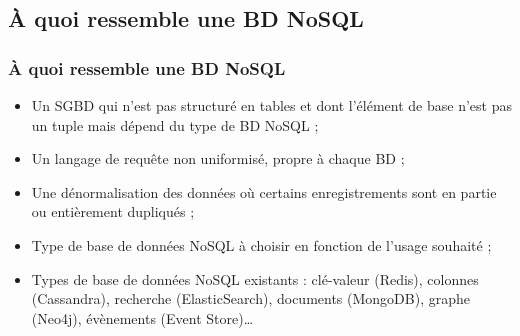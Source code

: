     \subsection{À quoi ressemble une BD NoSQL}
    \begin{frame}
        \frametitle{À quoi ressemble une BD NoSQL}

        \begin{itemize}
            \item Un SGBD qui n'est pas structuré en tables et dont l'élément de base n'est pas un tuple mais dépend du type de BD NoSQL ;
            \item Un langage de requête non uniformisé, propre à chaque BD ;
            \item Une dénormalisation des données où certains enregistrements sont en partie ou entièrement dupliqués ;
            \item Type de base de données NoSQL à choisir en fonction de l'usage souhaité ;
            \item Types de base de données NoSQL existants : clé-valeur (Redis), colonnes (Cassandra), recherche (ElasticSearch), documents (MongoDB), graphe (Neo4j), évènements (Event Store)\dots
        \end{itemize}
    \end{frame}
